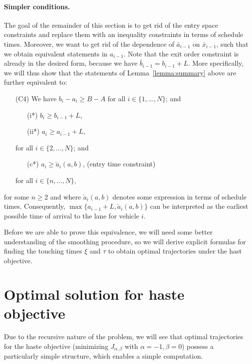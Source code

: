 \documentclass[a4paper]{report}
\theoremstyle{definition}
\theoremstyle{plain}
\newcommand\note[1]{{\color{Navy}\noindent#1}}
\begin{document}
\paragraph{Simpler conditions.}
The goal of the remainder of this section is to get rid of the entry space
constraints and replace them with an inequality constraints in terms of schedule
times.
%
Moreover, we want to get rid of the dependence of $\bar{a}_{i-1}$ on
$\bar{x}_{i-1}$, such that we obtain equivalent statements in $a_{i-1}$. Note
that the exit order constraint is already in the desired form, because we have
$\bar{b}_{i-1} = b_{i-1} + L$.
%
More specifically, we will thus show that the statements of
Lemma~\ref{lemma:summary} above are further equivalent to:
\begin{enumerate}[leftmargin=3em]
  \item[(C4)] We have $b_{i} - a_{i} \geq B-A$ for all $i \in \{1, \dots, N\}$; and
  \begin{enumerate}[leftmargin=4em,midpenalty=10]
    \item[(i*)\quad] $b_{i} \geq b_{i-1} + L$,
    \item[(ii*)\quad] $a_{i} \geq a_{i-1} + L$,
  \end{enumerate}
  \TabPositions{3cm}
  for all $i \in \{2, \dots, N\}$; and
  \begin{enumerate}[leftmargin=4em,midpenalty=10]
    \item[(c*)\quad] $a_{i} \geq \check{a}_i(a,b)$, \tab (entry time constraint)
  \end{enumerate}
  for all $i \in \{n, \dots, N \}$,
\end{enumerate}
for some $n \geq 2$ and where $\check{a}_{i}(a,b)$ denotes some expression in terms of
schedule times. Consequently, $\max\{a_{i-1} + L, \check{a}_{i}(a,b)\}$ can be
interpreted as the earliest possible time of arrival to the lane for vehicle
$i$.

\note{Before we are able to prove this equivalence, we will need some better
  understanding of the smoothing procedure, so we will derive explicit formulas
  for finding the touching times $\xi$ and $\tau$ to obtain optimal trajectories
  under the hast objective.}

\section{Optimal solution for haste objective}\label{sec:explicit-trajectories}

Due to the recursive nature of the problem, we will see that optimal
trajectories for the haste objective (minimizing $J_{\alpha,\beta}$ with
$\alpha=-1,\beta=0$) possess a particularly simple structure, which enables a
simple computation.
\end{document}
